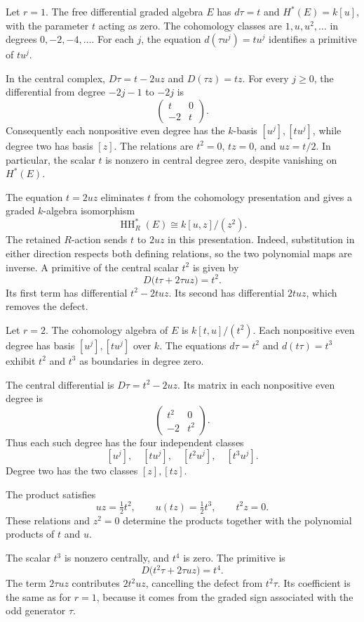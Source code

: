 \begin{example}[The relation $t=0$]\label{ex:rel-r1}
Let $r=1$. The free differential graded algebra $E$ has $d\tau=t$ and
$H^*(E)=k[u]$, with the parameter $t$ acting as zero.
The cohomology classes are $1,u,u^2,\ldots$ in degrees $0,-2,-4,\ldots$.
For each $j$, the equation $d(\tau u^j)=tu^j$ identifies a primitive of $tu^j$.

In the central complex, $D\tau=t-2uz$ and $D(\tau z)=tz$.
For every $j\geq0$, the differential from degree $-2j-1$ to $-2j$ is
\[
 \begin{pmatrix}t&0\\-2&t\end{pmatrix}.
\]
Consequently each nonpositive even degree has the $k$-basis
$[u^j],[tu^j]$, while degree two has basis $[z]$.
The relations are $t^2=0$, $tz=0$, and $uz=t/2$.
In particular, the scalar $t$ is nonzero in central degree zero, despite
vanishing on $H^*(E)$.

The equation $t=2uz$ eliminates $t$ from the cohomology presentation and
gives a graded $k$-algebra isomorphism
\[
 \operatorname{HH}_R^*(E)\cong k[u,z]/(z^2).
\]
The retained $R$-action sends $t$ to $2uz$ in this presentation.
Indeed, substitution in either direction respects both defining
relations, so the two polynomial maps are inverse.
A primitive of the central scalar $t^2$ is given by
\[
 D\bigl(t\tau+2\tau uz\bigr)=t^2.
\]
Its first term has differential $t^2-2tuz$.
Its second has differential $2tuz$, which removes the defect.
\end{example}

\begin{example}[The relation $t^2=0$]\label{ex:rel-r2}
Let $r=2$. The cohomology algebra of $E$ is $k[t,u]/(t^2)$.
Each nonpositive even degree has basis $[u^j],[tu^j]$ over $k$.
The equations $d\tau=t^2$ and $d(t\tau)=t^3$ exhibit $t^2$ and $t^3$
as boundaries in degree zero.

The central differential is $D\tau=t^2-2uz$.
Its matrix in each nonpositive even degree is
\[
 \begin{pmatrix}t^2&0\\-2&t^2\end{pmatrix}.
\]
Thus each such degree has the four independent classes
\[
 [u^j],\quad[tu^j],\quad[t^2u^j],\quad[t^3u^j].
\]
Degree two has the two classes $[z],[tz]$.

The product satisfies
\[
 uz=\tfrac12t^2,\qquad u(tz)=\tfrac12t^3,\qquad t^2z=0.
\]
These relations and $z^2=0$ determine the products together with the
polynomial products of $t$ and $u$.

The scalar $t^3$ is nonzero centrally, and $t^4$ is zero.
The primitive is
\[
 D\bigl(t^2\tau+2\tau uz\bigr)=t^4.
\]
The term $2\tau uz$ contributes $2t^2uz$, cancelling the defect from
$t^2\tau$. Its coefficient is the same as for $r=1$, because it comes
from the graded sign associated with the odd generator $\tau$.
\end{example}

